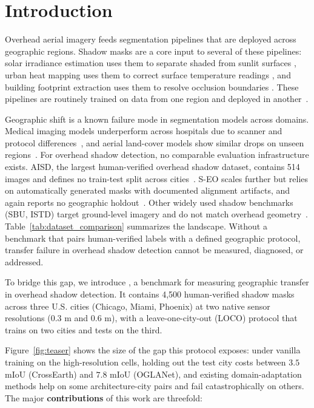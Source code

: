 \section{Introduction}
\label{sec:intro}

Overhead aerial imagery feeds segmentation pipelines that are deployed across geographic regions. Shadow masks are a core input to several of these pipelines: solar irradiance estimation uses them to separate shaded from sunlit surfaces \cite{batchu2024satellite}, urban heat mapping uses them to correct surface temperature readings \cite{dashadebench, ukkusuri2024heatwaves}, and building footprint extraction uses them to resolve occlusion boundaries \cite{seo}. These pipelines are routinely trained on data from one region and deployed in another~\cite{mittal2025overcoming, verma2025spatial}.

Geographic shift is a known failure mode in segmentation models across domains. Medical imaging models underperform across hospitals due to scanner and protocol differences~\cite{ogier2022flamby}, and aerial land-cover models show similar drops on unseen regions~\cite{wang2021loveda, gong2025crossearth}. For overhead shadow detection, no comparable evaluation infrastructure exists. AISD, the largest human-verified overhead shadow dataset, contains 514 images and defines no train-test split across cities~\cite{aisd}. S-EO scales further but relies on automatically generated masks with documented alignment artifacts, and again reports no geographic holdout~\cite{seo}. Other widely used shadow benchmarks (SBU, ISTD) target ground-level imagery and do not match overhead geometry~\cite{sbu, istd}. Table~\ref{tab:dataset_comparison} summarizes the landscape. Without a benchmark that pairs human-verified labels with a defined geographic protocol, transfer failure in overhead shadow detection cannot be measured, diagnosed, or addressed.




To bridge this gap, we introduce \shadow, a benchmark for measuring geographic transfer in overhead shadow detection. It contains 4{,}500 human-verified shadow masks across three U.S. cities (Chicago, Miami, Phoenix) at two native sensor resolutions (0.3 m and 0.6 m), with a leave-one-city-out (LOCO) protocol that trains on two cities and tests on the third. 

Figure~\ref{fig:teaser} shows the size of the gap this protocol exposes: under vanilla training on the high-resolution cells, holding out the test city costs between $3.5$ mIoU (CrossEarth) and $7.8$ mIoU (OGLANet), and existing domain-adaptation methods help on some architecture-city pairs and fail catastrophically on others. The major \textbf{contributions} of this work are threefold:

